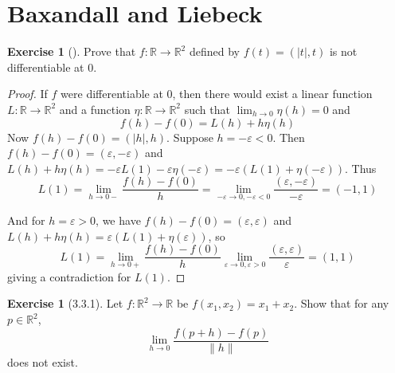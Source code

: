 \documentclass[reqno]{amsart}
\theoremstyle{plain}%
\theoremstyle{definition}
\newtheorem{exercise}[theorem]{Exercise}
\theoremstyle{remark}
\begin{document}
\section{Baxandall and Liebeck}

    \begin{exercise}[]
        Prove that $f  \colon \mathbb{R} \to \mathbb{R}^2$ defined
        by $f(t) = \left( \left| t \right| ,t \right) $ is not
        differentiable at $0$.
    \end{exercise}

    \begin{proof}
        If $f$ were differentiable at $0$, then there
        would exist a linear function $L  \colon \mathbb{R} \to 
        \mathbb{R}^2$ and a function
        $\eta  \colon \mathbb{R} \to \mathbb{R}^2$ such that
        $\lim_{h\to 0} \eta(h)=0$ and
        \[
        f\left( h \right) -f(0) = L(h)+ h \eta(h)
        \] 
        Now $f(h) - f(0) = \left( \left| h \right| ,h \right) $.
        Suppose $h = -\varepsilon <0$. Then
        $f(h) - f(0) = \left( \varepsilon, - \varepsilon \right) $ 
        and $L(h)+ h \eta \left( h \right) 
        = - \varepsilon L(1) - \varepsilon \eta \left( - \varepsilon
        \right) =
        -\varepsilon \left( L(1) + 
        \eta \left( -\varepsilon \right) \right) $.
        Thus 
        \[
           L(1) =\lim_{h\to 0-}
           \frac{f(h)-f(0)}{h} =
           \lim_{-\varepsilon \to 0, -\varepsilon < 0}
           \frac{\left( \varepsilon, - \varepsilon
           \right) }{- \varepsilon}= \left( -1,1 \right) 
       \]
        
        And for $h = \varepsilon > 0$, we have
        $f\left( h \right) -f(0) = 
        \left( \varepsilon, \varepsilon \right) $ and
        $L\left( h \right) + h \eta (h)=
        \varepsilon \left( L(1) + \eta (\varepsilon) \right) $, so
        \[
        L(1) = 
        \lim_{h\to 0+} \frac{f(h) - f(0)}{h} 
        \lim_{\varepsilon \to 0, \varepsilon > 0} 
        \frac{\left( \varepsilon, \varepsilon \right) }{\varepsilon}
        = \left( 1,1 \right) 
        \] 
        giving a contradiction for
        $L(1)$.
    \end{proof}

    \begin{exercise}[3.3.1]
        Let $f  \colon \mathbb{R}^2 \to \mathbb{R}$ be
        $f\left( x_1, x_2 \right) = x_1+ x_2$. Show that
        for any $p \in \mathbb{R}^2$,
        \[
        \lim_{h\to 0} \frac{f\left( p+h \right) -f(p)}{\|h\|}
        \] 
        does not exist.
    \end{exercise}
\end{document}
